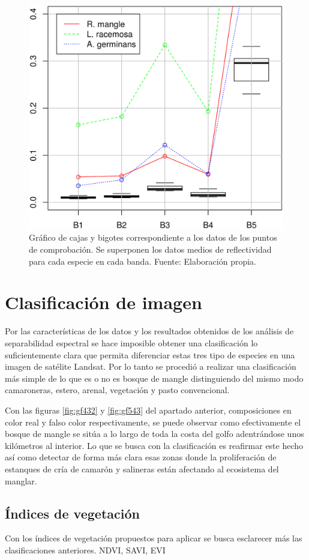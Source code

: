 \begin{figure}
	\centering
	\includegraphics[width=0.8\linewidth]{./Imagenes/grafica_comprob.eps}
	\caption[Gráfico de puntos de comprobación]{Gráfico de cajas y bigotes correspondiente a los datos de los puntos de comprobación. Se superponen los datos medios de reflectividad para cada especie en cada banda. Fuente: Elaboración propia.}
	\label{fig:grafica_comprob}
\end{figure}

\section{Clasificación de imagen}
Por las características de los datos y los resultados obtenidos de los análisis de separabilidad espectral se hace imposible obtener una clasificación lo suficientemente clara que permita diferenciar estas tres tipo de especies en una imagen de satélite Landsat. Por lo tanto se procedió a realizar una clasificación más simple de lo que es o no es bosque de mangle distinguiendo del mismo modo camaroneras, estero, arenal, vegetación y pasto convencional.\Sep

Con las figuras \ref{fig:gf432} y \ref{fig:gf543} del apartado anterior, composiciones en color real y falso color respectivamente, se puede observar como efectivamente el bosque de mangle se sitúa a lo largo de toda la costa del golfo adentrándose unos kilómetros al interior. Lo que se busca con la clasificación es reafirmar este hecho así como detectar de forma más clara esas zonas donde la proliferación de estanques de cría de camarón y salineras están afectando al ecosistema del manglar.\Sep

\subsection{Índices de vegetación}
Con los índices de vegetación propuestos para aplicar se busca esclarecer más las clasificaciones anteriores.
NDVI, SAVI, EVI